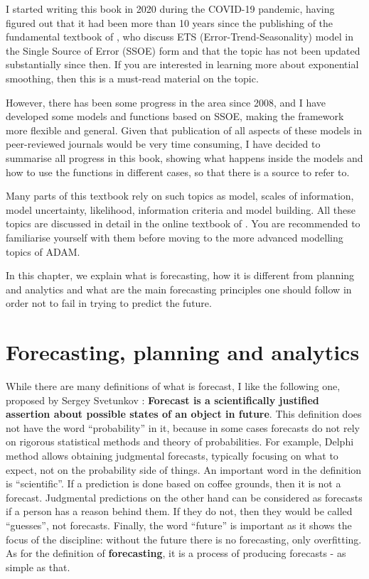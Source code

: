 \documentclass[
]{book}
\theoremstyle{definition}
\theoremstyle{definition}
\theoremstyle{definition}
\theoremstyle{definition}
\theoremstyle{remark}
\begin{document}
I started writing this book in 2020 during the COVID-19 pandemic, having figured out that it had been more than 10 years since the publishing of the fundamental textbook of \citet{Hyndman2008b}, who discuss ETS (Error-Trend-Seasonality) model in the Single Source of Error (SSOE) form and that the topic has not been updated substantially since then. If you are interested in learning more about exponential smoothing, then this is a must-read material on the topic.

However, there has been some progress in the area since 2008, and I have developed some models and functions based on SSOE, making the framework more flexible and general. Given that publication of all aspects of these models in peer-reviewed journals would be very time consuming, I have decided to summarise all progress in this book, showing what happens inside the models and how to use the functions in different cases, so that there is a source to refer to.

Many parts of this textbook rely on such topics as model, scales of information, model uncertainty, likelihood, information criteria and model building. All these topics are discussed in detail in the online textbook of \citet{SvetunkovSBA}. You are recommended to familiarise yourself with them before moving to the more advanced modelling topics of ADAM.

In this chapter, we explain what is forecasting, how it is different from planning and analytics and what are the main forecasting principles one should follow in order not to fail in trying to predict the future.

\hypertarget{forecastingPlanningAnalytics}{%
\section{Forecasting, planning and analytics}\label{forecastingPlanningAnalytics}}

While there are many definitions of what is forecast, I like the following one, proposed by Sergey Svetunkov \citep{Svetunkov2014Textbook}: \textbf{Forecast is a scientifically justified assertion about possible states of an object in future}. This definition does not have the word ``probability'' in it, because in some cases forecasts do not rely on rigorous statistical methods and theory of probabilities. For example, Delphi method allows obtaining judgmental forecasts, typically focusing on what to expect, not on the probability side of things. An important word in the definition is ``scientific''. If a prediction is done based on coffee grounds, then it is not a forecast. Judgmental predictions on the other hand can be considered as forecasts if a person has a reason behind them. If they do not, then they would be called ``guesses'', not forecasts. Finally, the word ``future'' is important as it shows the focus of the discipline: without the future there is no forecasting, only overfitting. As for the definition of \textbf{forecasting}, it is a process of producing forecasts - as simple as that.
\end{document}

